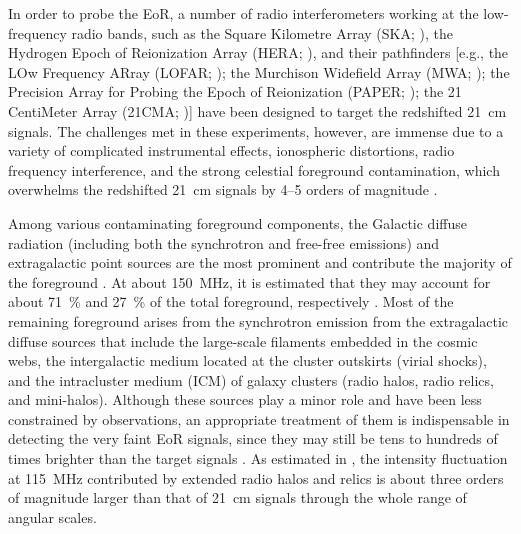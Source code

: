\documentclass[modern]{aastex62}
\begin{document}
In order to probe the EoR, a number of radio interferometers
working at the low-frequency radio bands, such as
the Square Kilometre Array (SKA; \citealt{mellema2013rev,koopmans2015rev}),
the Hydrogen Epoch of Reionization Array (HERA; \citealt{deboer2017}),
{\color{magenta}
and their pathfinders [e.g.,
the LOw Frequency ARray (LOFAR; \citealt{vanHaarlem2013});
the Murchison Widefield Array (MWA; \citealt{bowman2013,tingay2013});
the Precision Array for Probing the Epoch of Reionization
(PAPER; \citealt{parsons2010});
the 21 CentiMeter Array (21CMA; \citealt{zheng2016})]
}
have been designed to target the redshifted 21~cm signals.
The challenges met in these experiments, however, are immense
due to a variety of complicated instrumental effects,
ionospheric distortions, radio frequency interference, and the
strong celestial foreground contamination, which overwhelms the
redshifted 21~cm signals by \numrange{4}{5} orders of magnitude
\citep[see][for a review]{morales2010rev}.

Among various contaminating foreground components, the Galactic diffuse
radiation (including both the synchrotron and free-free emissions)
and extragalactic point sources are the most prominent and contribute
the majority of the foreground
\citep[e.g.,][]{shaver1999,diMatteo2004,gleser2008,liu2012,murray2017}.
At about \SI{150}{\MHz}, it is estimated that they may account for
about \SI{71}{\percent} and \SI{27}{\percent} of the total foreground,
respectively \citep{shaver1999}.
Most of the remaining foreground arises from the synchrotron emission
from the extragalactic diffuse sources that include the large-scale
filaments embedded in the cosmic webs,
the intergalactic medium located at the cluster outskirts (virial shocks),
and the intracluster medium (ICM) of galaxy clusters (radio halos,
radio relics, and mini-halos).
Although these sources play a minor role and have been less constrained
by observations, an appropriate treatment of them is indispensable
in detecting the very faint EoR signals, since they may still be
{\color{magenta}
tens to hundreds of times brighter than the target signals
\citep[e.g.,][]{waxman2000,diMatteo2004,gleser2008}.
As estimated in \citet{diMatteo2004}, the intensity fluctuation
at \SI{115}{\MHz} contributed by extended radio halos and relics
is about three orders of magnitude larger than that of 21~cm signals
through the whole range of angular scales.
}
\end{document}
